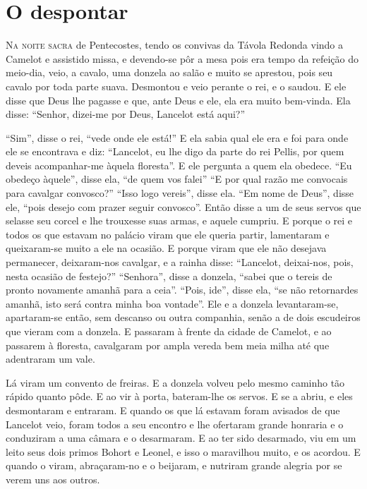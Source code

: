 
\begin{comment}
TRADUÇÃO DA VERSÃO ALEMÃ DE \textit{A DEMANDA DO SANTO GRAAL} (Códice 147 da
\textit{Bibliotheca Palatina Germaniae}, de Heidelberg, fins do século XIII). 
\end{comment}

\chapter{O despontar} 

\textsc{Na noite sacra} de Pentecostes, tendo os convivas da Távola Redonda vindo a
Camelot e assistido missa, e devendo-se pôr a mesa pois era tempo da refeição do
meio-dia, veio, a cavalo, uma donzela ao salão e muito se aprestou, pois seu
cavalo por toda parte suava. Desmontou e veio perante o rei, e o saudou. E ele
disse que Deus lhe pagasse e que, ante Deus e ele, ela era muito bem-vinda. Ela
disse: “Senhor, dizei-me por Deus, Lancelot está aqui?”

“Sim”, disse o rei, “vede onde ele está!” E ela sabia qual ele era e foi para
onde ele se encontrava e diz: “Lancelot, eu lhe digo da parte do rei Pellis,
por quem deveis acompanhar-me àquela floresta”. E ele pergunta a quem ela
obedece. “Eu obedeço àquele”, disse ela, “de quem vos falei” “E por qual razão
me convocais para cavalgar convosco?” “Isso logo vereis”, disse ela. “Em nome
de Deus”, disse ele, “pois desejo com prazer seguir convosco”. Então disse a um
de seus servos que selasse seu corcel e lhe trouxesse suas armas, e aquele
cumpriu. E porque o rei e todos os que estavam no palácio viram que ele queria
partir, lamentaram e queixaram-se muito a ele na ocasião. E porque viram que
ele não desejava permanecer, deixaram-nos cavalgar, e a rainha disse:
“Lancelot, deixai-nos, pois, nesta ocasião de festejo?” “Senhora”, disse a
donzela, “sabei que o tereis de pronto novamente amanhã para a ceia”. “Pois,
ide”, disse ela, “se não retornardes amanhã, isto será contra minha boa
vontade”. Ele e a donzela levantaram-se, apartaram-se então, sem descanso ou
outra companhia, senão a de dois escudeiros que vieram com a donzela. E
passaram à frente da cidade de Camelot, e ao passarem à floresta, cavalgaram por
ampla vereda bem meia milha até que adentraram um vale.

Lá viram um convento de freiras. E a donzela volveu pelo mesmo caminho tão
rápido quanto pôde. E ao vir à porta, bateram-lhe os servos. E se a abriu, e
eles desmontaram e entraram. E quando os que lá estavam foram avisados de que
Lancelot veio, foram todos a seu encontro e lhe ofertaram grande honraria e o
conduziram a uma câmara e o desarmaram. E ao ter sido desarmado, viu em um
leito seus dois primos Bohort e Leonel, e isso o maravilhou muito, e os
acordou. E quando o viram, abraçaram-no e o beijaram, e nutriram grande alegria
por se verem uns aos outros. 

